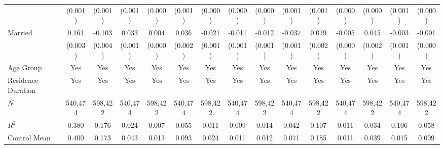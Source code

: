 \documentclass[serif, aspectratio=169]{beamer}
\begin{document}
\begin{frame}
\begin{table}[htbp]
{\begin{tabular}{@{}l*{14}{c}@{}}
          &  (0.001)         &  (0.001)         &  (0.001)         &  (0.000)         &  (0.001)         &  (0.000)         &  (0.000)         &  (0.000)         &  (0.001)         &  (0.001)         &  (0.000)         &  (0.000)         &  (0.001)         &  (0.000)         \\
\addlinespace
Married   &    0.161\sym{***}&   -0.103\sym{***}&    0.033\sym{***}&    0.004\sym{***}&    0.036\sym{***}&   -0.021\sym{***}&   -0.011\sym{***}&   -0.012\sym{***}&   -0.037\sym{***}&    0.019\sym{***}&   -0.005\sym{***}&    0.045\sym{***}&   -0.003\sym{***}&   -0.001\sym{*}  \\
          &  (0.003)         &  (0.004)         &  (0.001)         &  (0.000)         &  (0.002)         &  (0.001)         &  (0.001)         &  (0.001)         &  (0.001)         &  (0.002)         &  (0.000)         &  (0.002)         &  (0.001)         &  (0.000)         \\
\addlinespace
Age Group &      Yes         &      Yes         &      Yes         &      Yes         &      Yes         &      Yes         &      Yes         &      Yes         &      Yes         &      Yes         &      Yes         &      Yes         &      Yes         &      Yes         \\
\addlinespace
Residence Duration &      Yes         &      Yes         &      Yes         &      Yes         &      Yes         &      Yes         &      Yes         &      Yes         &      Yes         &      Yes         &      Yes         &      Yes         &      Yes         &      Yes         \\
\midrule
$\textit{N}$&  540,474         &  598,422         &  540,474         &  598,422         &  540,474         &  598,422         &  540,474         &  598,422         &  540,474         &  598,422         &  540,474         &  598,422         &  540,474         &  598,422         \\
$\textit{R}^2$&    0.380         &    0.176         &    0.024         &    0.007         &    0.055         &    0.011         &    0.009         &    0.014         &    0.042         &    0.107         &    0.011         &    0.034         &    0.106         &    0.058         \\
Control Mean&    0.400         &    0.173         &    0.043         &    0.013         &    0.093         &    0.024         &    0.011         &    0.012         &    0.071         &    0.185         &    0.011         &    0.039         &    0.015         &    0.009         \\

\end{tabular}}
\end{table}
\end{frame}
\end{document}
